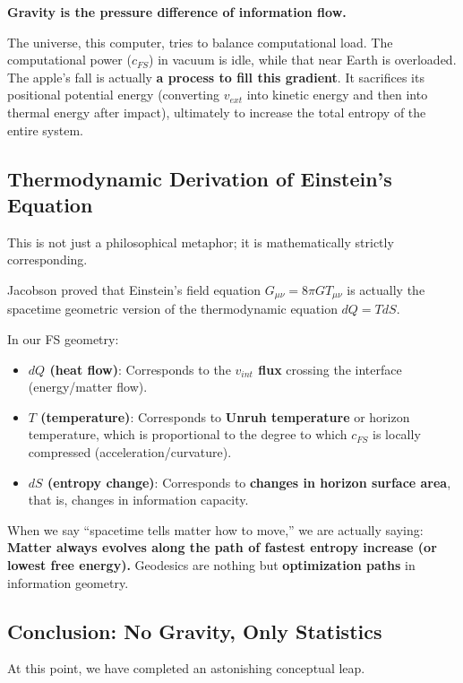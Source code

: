 \textbf{Gravity is the pressure difference of information flow.}

The universe, this computer, tries to balance computational load. The computational power ($c_{FS}$) in vacuum is idle, while that near Earth is overloaded. The apple's fall is actually \textbf{a process to fill this gradient}. It sacrifices its positional potential energy (converting $v_{ext}$ into kinetic energy and then into thermal energy after impact), ultimately to increase the total entropy of the entire system.

\subsection{Thermodynamic Derivation of Einstein's Equation}

This is not just a philosophical metaphor; it is mathematically strictly corresponding.

Jacobson proved that Einstein's field equation $G_{\mu\nu} = 8\pi G T_{\mu\nu}$ is actually the spacetime geometric version of the thermodynamic equation $dQ = TdS$.

In our FS geometry:

\begin{itemize}
\item \textbf{$dQ$ (heat flow)}: Corresponds to the \textbf{$v_{int}$ flux} crossing the interface (energy/matter flow).

\item \textbf{$T$ (temperature)}: Corresponds to \textbf{Unruh temperature} or horizon temperature, which is proportional to the degree to which $c_{FS}$ is locally compressed (acceleration/curvature).

\item \textbf{$dS$ (entropy change)}: Corresponds to \textbf{changes in horizon surface area}, that is, changes in information capacity.
\end{itemize}

When we say ``spacetime tells matter how to move,'' we are actually saying: \textbf{Matter always evolves along the path of fastest entropy increase (or lowest free energy).} Geodesics are nothing but \textbf{optimization paths} in information geometry.

\subsection{Conclusion: No Gravity, Only Statistics}

At this point, we have completed an astonishing conceptual leap.

